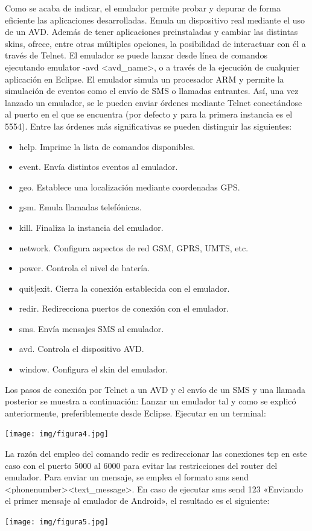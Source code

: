 \documentclass[12 pt, a4paper, twoside]{article}
\begin{document}
Como se acaba de indicar, el emulador permite probar y depurar de forma
eficiente las aplicaciones desarrolladas. Emula un dispositivo real mediante el uso
de un AVD. Además de tener aplicaciones preinstaladas y cambiar las distintas
skins, ofrece, entre otras múltiples opciones, la posibilidad de interactuar con él a
través de Telnet. El emulador se puede lanzar desde línea de comandos ejecutando
emulator -avd <avd\_name>, o a través de la ejecución de cualquier aplicación
en Eclipse. El emulador simula un procesador ARM y permite la simulación de
eventos como el envío de SMS o llamadas entrantes. Así, una vez lanzado un
emulador, se le pueden enviar órdenes mediante Telnet conectándose al puerto en
el que se encuentra (por defecto y para la primera instancia es el 5554). Entre las
órdenes más significativas se pueden distinguir las siguientes:
\begin{itemize}
\item help. Imprime la lista de comandos disponibles.
\item event. Envía distintos eventos al emulador.
\item geo. Establece una localización mediante coordenadas GPS.
\item gsm. Emula llamadas telefónicas.
\item kill. Finaliza la instancia del emulador.
\item network. Configura aspectos de red GSM, GPRS, UMTS, etc.
\item power. Controla el nivel de batería.
\item quit|exit. Cierra la conexión establecida con el emulador.
\item redir. Redirecciona puertos de conexión con el emulador.
\item sms. Envía mensajes SMS al emulador.
\item avd. Controla el dispositivo AVD.
\item window. Configura el skin del emulador.
\end{itemize}
Los pasos de conexión por Telnet a un AVD y el envío de un SMS y una
llamada posterior se muestra a continuación:
Lanzar un emulador tal y como se explicó anteriormente, preferiblemente
desde Eclipse.
Ejecutar en un terminal:
\begin{center}
  \texttt{[image: img/figura4.jpg]}
\end{center}
La razón del empleo del comando redir es redireccionar las conexiones tcp en
este caso con el puerto 5000 al 6000 para evitar las restricciones del router del
emulador.
Para enviar un mensaje, se emplea el formato sms send <phonenumber><text\_message>.
En caso de ejecutar sms send 123 «Enviando el primer mensaje al emulador
de Android», el resultado es el siguiente:
\begin{center}
  \texttt{[image: img/figura5.jpg]}
\end{center}
\end{document}

